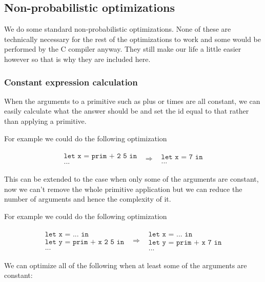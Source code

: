 \documentclass[a4paper]{article}
\newcommand{\optimization}[2]{
	\[
		\begin{array}{rcl}
			#1 & \Rightarrow & #2
		\end{array}
	\]
}
\begin{document}

\subsection{Non-probabilistic optimizations}

We do some standard non-probabilistic optimizations. None of these are technically necessary for the rest of the optimizations to work and some would be performed by the C compiler anyway. They still make our life a little easier however so that is why they are included here.




\subsubsection{Constant expression calculation}

When the arguments to a primitive such as plus or times are all constant, we can easily calculate what the answer should be and set the id equal to that rather than applying a primitive.

For example we could do the following optimization

\optimization{
	\begin{array}{l}
		\texttt{let x = prim + 2 5 in} \\
		\texttt{...}
	\end{array}
}{
	\begin{array}{l}
		\texttt{let x = 7 in} \\
		\texttt{...}
	\end{array}
}
This can be extended to the case when only some of the arguments are constant, now we can't remove the whole primitive application but we can reduce the number of arguments and hence the complexity of it.

For example we could do the following optimization

\optimization{
	\begin{array}{l}
		\texttt{let x = ... in} \\
		\texttt{let y = prim + x 2 5 in} \\
		\texttt{...}
	\end{array}
}{
	\begin{array}{l}
		\texttt{let x = ... in} \\
		\texttt{let y = prim + x 7 in} \\
		\texttt{...}
	\end{array}
}
We can optimize all of the following when at least some of the arguments are constant:
\end{document}
